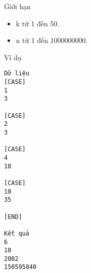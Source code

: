 Giới hạn
\begin{itemize}
	\item     k từ 1 đến 50.   
	\item     n từ 1 đến 1000000000.   
\end{itemize}
Ví dụ
\begin{verbatim}
Dữ liệu
[CASE]
1
3

[CASE]
2
3

[CASE]
4
10

[CASE]
10
35

[END]

Kết quả
6
10
2002
150595840
\end{verbatim}